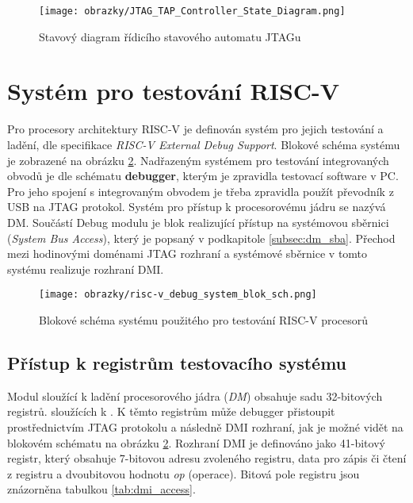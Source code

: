 \begin{figure}[H]
  \begin{center}
    \texttt{[image: obrazky/JTAG\_TAP\_Controller\_State\_Diagram.png]}
  \end{center}
  \caption{Stavový diagram řídicího stavového automatu JTAGu \cite{JTAG_TAP_diagram}}
	\label{fig:tap_controller}
\end{figure}

\section{Systém pro testování \acs{RISC-V}}		\label{sec:risc-v_dbg}
Pro procesory architektury \acs{RISC-V} je definován systém pro jejich testování a ladění, dle specifikace \textit{RISC-V External Debug Support}. Blokové schéma systému je zobrazené na obrázku \ref{fig:blok_sch_risc-v_dbg}. Nadřazeným systémem pro testování integrovaných obvodů je dle schématu \textbf{debugger}, kterým je zpravidla testovací software v PC. Pro jeho spojení s integrovaným obvodem je třeba zpravidla použít převodník z USB na JTAG protokol. Systém pro přístup k procesorovému jádru se nazývá \ac{DM}. Součástí Debug modulu je blok realizující přístup na systémovou sběrnici (\textit{System Bus Access}), který je popsaný v podkapitole \ref{subsec:dm_sba}. Přechod mezi hodinovými doménami \acs{JTAG} rozhraní a systémové sběrnice v tomto systému realizuje rozhraní \ac{DMI}. \cite{risc-v_dbg}


\begin{figure}[!h]
  \begin{center}
    \texttt{[image: obrazky/risc-v\_debug\_system\_blok\_sch.png]}
  \end{center}
  \caption{Blokové schéma systému použitého pro testování \acs{RISC-V} procesorů \cite{risc-v_dbg}}
	\label{fig:blok_sch_risc-v_dbg}
\end{figure}

\subsection{Přístup k registrům testovacího systému}		\label{subsec:dm_reg_access}
Modul sloužící k ladění procesorového jádra (\textit{\acl{DM}}) obsahuje sadu 32-bitových registrů. sloužících k . K těmto registrům může debugger přistoupit prostřednictvím \acs{JTAG} protokolu a následně \acs{DMI} rozhraní, jak je možné vidět na blokovém schématu na obrázku \ref{fig:blok_sch_risc-v_dbg}. Rozhraní \acs{DMI} je definováno jako 41-bitový registr, který obsahuje 7-bitovou adresu zvoleného registru, data pro zápis či čtení z registru a dvoubitovou hodnotu \textit{op} (operace). Bitová pole registru jsou znázorněna tabulkou \ref{tab:dmi_access}.   \cite{risc-v_dbg}

